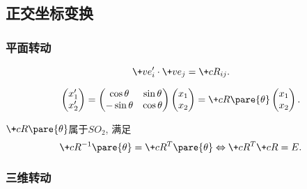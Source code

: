\documentclass[../LectureNotes.tex]{subfiles}
\begin{document}


\subsection{正交坐标变换} %
\label{sub:正交坐标变换}

\subsubsection{平面转动} %
\label{ssub:平面转动}

\begin{figure}[ht]
    \centering
\end{figure}
\begin{lemma}
    \[ \+ve'_i\cdot\+ve_j = \+cR_{ij}. \]
\end{lemma}
\begin{finale}
\begin{lemma}[旋转变换的矩阵表述]
    \[ \begin{pmatrix}
        x'_1 \\
        x'_2
    \end{pmatrix} = \begin{pmatrix}
        \cos\theta & \sin\theta \\
        -\sin\theta & \cos\theta
    \end{pmatrix}\begin{pmatrix}
        x_1\\
        x_2
    \end{pmatrix} = \+cR\pare{\theta}\begin{pmatrix}
        x_1\\
        x_2
    \end{pmatrix}. \]
\end{lemma}
\end{finale}
\begin{lemma}
    $\+cR\pare{\theta}$属于$SO_2$, 满足
    \[ \+cR^{-1}\pare{\theta} = \+cR^T\pare{\theta} \Leftrightarrow \+cR^T\+cR = E. \]
\end{lemma}


\subsubsection{三维转动} %
\label{ssub:三维转动}
\end{document}
